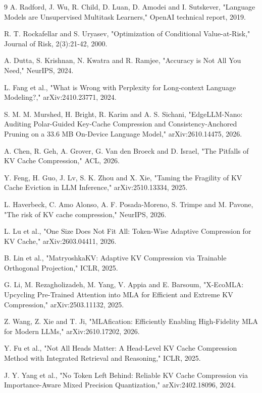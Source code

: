 \documentclass[11pt]{article}
\begin{document}
\begin{thebibliography}{9}
 A. Radford, J. Wu, R. Child, D. Luan, D. Amodei and I. Sutskever, "Language Models are Unsupervised Multitask Learners," OpenAI technical report, 2019.

 R. T. Rockafellar and S. Uryasev, "Optimization of Conditional Value-at-Risk," Journal of Risk, 2(3):21-42, 2000.

 A. Dutta, S. Krishnan, N. Kwatra and R. Ramjee, "Accuracy is Not All You Need," NeurIPS, 2024.

 L. Fang et al., "What is Wrong with Perplexity for Long-context Language Modeling?," arXiv:2410.23771, 2024.

 S. M. M. Murshed, H. Bright, R. Karim and A. S. Sichani, "EdgeLLM-Nano: Auditing Polar-Guided Key-Cache Compression and Consistency-Anchored Pruning on a 33.6 MB On-Device Language Model," arXiv:2610.14475, 2026.

 A. Chen, R. Geh, A. Grover, G. Van den Broeck and D. Israel, "The Pitfalls of KV Cache Compression," ACL, 2026.

 Y. Feng, H. Guo, J. Lv, S. K. Zhou and X. Xie, "Taming the Fragility of KV Cache Eviction in LLM Inference," arXiv:2510.13334, 2025.

 L. Haverbeck, C. Amo Alonso, A. F. Posada-Moreno, S. Trimpe and M. Pavone, "The risk of KV cache compression," NeurIPS, 2026.

 L. Lu et al., "One Size Does Not Fit All: Token-Wise Adaptive Compression for KV Cache," arXiv:2603.04411, 2026.

 B. Lin et al., "MatryoshkaKV: Adaptive KV Compression via Trainable Orthogonal Projection," ICLR, 2025.

 G. Li, M. Rezagholizadeh, M. Yang, V. Appia and E. Barsoum, "X-EcoMLA: Upcycling Pre-Trained Attention into MLA for Efficient and Extreme KV Compression," arXiv:2503.11132, 2025.

 Z. Wang, Z. Xie and T. Ji, "MLAfication: Efficiently Enabling High-Fidelity MLA for Modern LLMs," arXiv:2610.17202, 2026.

 Y. Fu et al., "Not All Heads Matter: A Head-Level KV Cache Compression Method with Integrated Retrieval and Reasoning," ICLR, 2025.

 J. Y. Yang et al., "No Token Left Behind: Reliable KV Cache Compression via Importance-Aware Mixed Precision Quantization," arXiv:2402.18096, 2024.


\end{thebibliography}
\end{document}
